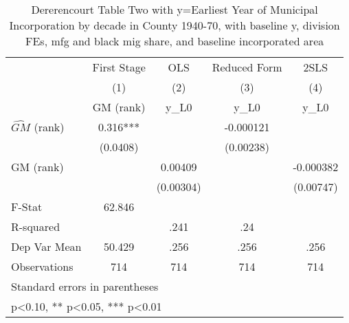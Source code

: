 \begin{table}[htbp]\centering
\def\sym#1{\ifmmode^{#1}\else\(^{#1}\)\fi}
\caption{Dererencourt Table Two with y=Earliest Year of Municipal Incorporation by decade in County 1940-70, with baseline y, division FEs, mfg and black mig share, and baseline incorporated area}
\begin{tabular}{l*{4}{c}}
\toprule
                    & First Stage   &         OLS   &Reduced Form   &        2SLS   \\
                    &\multicolumn{1}{c}{(1)}&\multicolumn{1}{c}{(2)}&\multicolumn{1}{c}{(3)}&\multicolumn{1}{c}{(4)}\\
                    &\multicolumn{1}{c}{GM  (rank)}&\multicolumn{1}{c}{y\_L0}&\multicolumn{1}{c}{y\_L0}&\multicolumn{1}{c}{y\_L0}\\
\midrule
$\hat{GM}$ (rank)   &       0.316***&               &   -0.000121   &               \\
                    &    (0.0408)   &               &   (0.00238)   &               \\
\addlinespace
GM  (rank)          &               &     0.00409   &               &   -0.000382   \\
                    &               &   (0.00304)   &               &   (0.00747)   \\
\midrule
F-Stat              &      62.846   &               &               &               \\
R-squared           &               &        .241   &         .24   &               \\
Dep Var Mean        &      50.429   &        .256   &        .256   &        .256   \\
Observations        &         714   &         714   &         714   &         714   \\
\bottomrule
\multicolumn{5}{l}{\footnotesize Standard errors in parentheses}\\
\multicolumn{5}{l}{\footnotesize * p<0.10, ** p<0.05, *** p<0.01}\\
\end{tabular}
\end{table}
